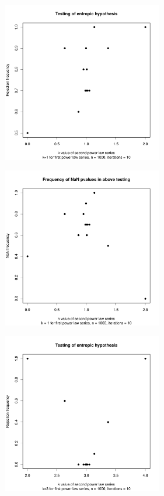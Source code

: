 \begin{figure}[hbt]
    \centering
    \begin{subfigure}[b]{0.3\textwidth}
        \centering
        \includegraphics[height=7cm,keepaspectratio]{./powerlaw/rejectionPlot,k1=1,n=1000,iterations=10.pdf}
    \end{subfigure}
    \hfill
    \begin{subfigure}[b]{0.5\textwidth}
        \centering
        \includegraphics[height=7cm,keepaspectratio]{./powerlaw/NaNPlot,k1=1,n=1000,iterations=10.pdf}
    \end{subfigure}
    \vfill
    \begin{subfigure}[b]{0.3\textwidth}
        \centering
        \includegraphics[height=7cm,keepaspectratio]{./powerlaw/rejectionPlot,k1=3,n=1000,iterations=10.pdf}

\end{subfigure}
\end{figure}
